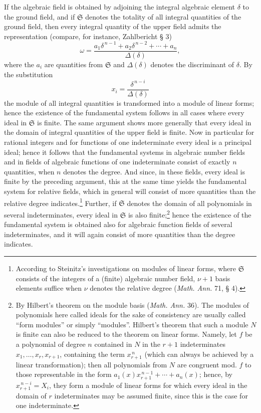 \documentclass[11pt]{article}
\providecommand{\frS}{\mathfrak S}
\begin{document}
If the algebraic field is obtained by adjoining the integral algebraic element \(\delta\) to the ground field, and if \(\frS\) denotes the totality of all integral quantities of the ground field, then every integral quantity of the upper field admits the representation (compare, for instance, Zahlbericht § 3)
\[
\omega=\frac{a_1\delta^{\,n-1}+a_2\delta^{\,n-2}+\cdots+a_n}{\Delta(\delta)},
\]
where the \(a_i\) are quantities from \(\frS\) and \(\Delta(\delta)\) denotes the discriminant of \(\delta\). By the substitution
\[
x_i=\frac{\delta^{\,n-i}}{\Delta(\delta)}
\]
the module of all integral quantities is transformed into a module of linear forms; hence the existence of the fundamental system follows in all cases where every ideal in \(\frS\) is finite. The same argument shows more generally that every ideal in the domain of integral quantities of the upper field is finite. Now in particular for rational integers and for functions of one indeterminate every ideal is a principal ideal; hence it follows that the fundamental systems in algebraic number fields and in fields of algebraic functions of one indeterminate consist of exactly \(n\) quantities, when \(n\) denotes the degree. And since, in these fields, every ideal is finite by the preceding argument, this at the same time yields the fundamental system for relative fields, which in general will consist of more quantities than the relative degree indicates.\footnote{According to Steinitz's investigations on modules of linear forms, where \(\frS\) consists of the integers of a (finite) algebraic number field, \(\nu+1\) basis elements suffice when \(\nu\) denotes the relative degree (\emph{Math. Ann.} 71, § 4).} Further, if \(\frS\) denotes the domain of all polynomials in several indeterminates, every ideal in \(\frS\) is also finite;\footnote{By Hilbert's theorem on the module basis (\emph{Math. Ann.} 36). The modules of polynomials here called ideals for the sake of consistency are usually called ``form modules'' or simply ``modules''. Hilbert's theorem that such a module \(N\) is finite can also be reduced to the theorem on linear forms. Namely, let \(f\) be a polynomial of degree \(n\) contained in \(N\) in the \(r+1\) indeterminates \(x_1,\ldots,x_r,x_{r+1}\), containing the term \(x_{r+1}^{\,n}\) (which can always be achieved by a linear transformation); then all polynomials from \(N\) are congruent mod. \(f\) to those representable in the form \(a_1(x)x_{r+1}^{\,n-1}+\cdots+a_n(x)\); hence, by \(x_{r+1}^{\,n-i}=X_i\), they form a module of linear forms for which every ideal in the domain of \(r\) indeterminates may be assumed finite, since this is the case for one indeterminate.} hence the existence of the fundamental system is obtained also for algebraic function fields of several indeterminates, and it will again consist of more quantities than the degree indicates.
\end{document}
